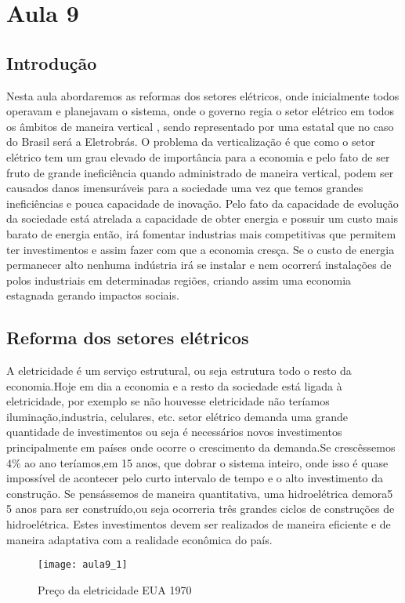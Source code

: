 \section{Aula 9}

\subsection{Introdução}
    Nesta aula abordaremos as reformas dos setores elétricos, onde inicialmente todos operavam e planejavam o sistema, onde o governo regia o setor elétrico em todos os âmbitos de maneira vertical , sendo representado por uma estatal que no caso do Brasil será a Eletrobrás.
    O problema da verticalização é que como o setor elétrico tem um grau elevado de importância para a economia e pelo fato de ser fruto de grande ineficiência quando administrado de maneira vertical, podem ser causados danos imensuráveis para a sociedade uma vez que temos grandes ineficiências e pouca capacidade de inovação. Pelo fato da capacidade de evolução da sociedade está atrelada a capacidade de obter energia e possuir um custo mais barato de energia então, irá fomentar industrias mais competitivas que permitem ter investimentos e assim fazer com que a economia cresça. Se o custo de energia permanecer alto nenhuma indústria irá se instalar e nem ocorrerá instalações de polos industriais em determinadas regiões, criando assim uma economia estagnada gerando impactos sociais.
    
\subsection{Reforma dos setores elétricos}
  A eletricidade é um serviço estrutural, ou seja estrutura todo o resto da economia.Hoje em dia a economia e a resto da sociedade está ligada à eletricidade, por exemplo se não houvesse eletricidade não teríamos iluminação,industria, celulares, etc. setor elétrico demanda uma grande quantidade de investimentos ou seja é necessários novos investimentos principalmente em países onde ocorre o crescimento da demanda.Se crescêssemos 4\% ao ano teríamos,em 15 anos, que dobrar o sistema inteiro, onde isso é quase impossível de acontecer pelo curto intervalo de tempo e o alto investimento da construção. Se pensássemos de maneira quantitativa, uma hidroelétrica demora5 5 anos para ser construído,ou seja ocorreria três grandes
ciclos de construções de hidroelétrica. Estes investimentos devem ser realizados de maneira eficiente e de maneira adaptativa com a realidade econômica do país.
\begin{figure}[H]
\begin{centering}
\texttt{[image: aula9\_1]}\protect\caption{\label{fig:aula9-1} Preço da eletricidade EUA 1970}
\end{centering}
\end{figure}

